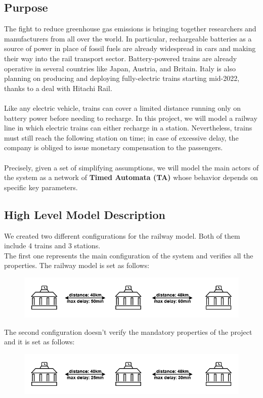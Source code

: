 \subsection{Purpose}
The fight to reduce greenhouse gas emissions is bringing together researchers and manufacturers from all over the world.
In particular, rechargeable batteries as a source of power in place of fossil fuels are already widespread in cars and
making their way into the rail transport sector. Battery-powered trains are already operative in several countries like
Japan, Austria, and Britain. Italy is also planning on producing and deploying fully-electric trains starting mid-2022,
thanks to a deal with Hitachi Rail.\\
\\ Like any electric vehicle, trains can cover a limited distance running only on battery power before needing to recharge.
In this project, we will model a railway line in which electric trains can either recharge in a station. Nevertheless,
trains must still reach the following station on time; in case of excessive delay, the company is obliged to issue
monetary compensation to the passengers.\\
\\ Precisely, given a set of simplifying assumptions, we will model the main actors of the system as a network of \textbf{Timed Automata (TA)}
whose behavior depends on specific key parameters.


\bigskip
\subsection{High Level Model Description}
We created two different configurations for the railway model. Both of them include 4 trains and 3 stations.\\
The first one represents the main configuration of the system and verifies all the properties. The railway model is set as follows:
\\
\begin{figure}[H]
    \centering
    \includegraphics[scale=0.4]{images/poweredRailway.png}
\end{figure}
\bigskip

The second configuration doesn't verify the mandatory properties of the project and it is set as follows:
\\
\begin{figure}[H]
    \centering
    \includegraphics[scale=0.4]{images/poweredRailwaySimple.png}
\end{figure}
\bigskip

